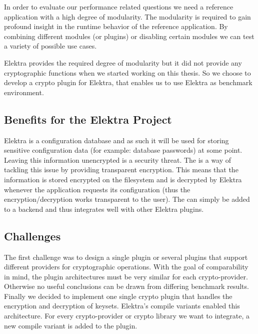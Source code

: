 In order to evaluate our performance related questions we need a reference application with a high degree of modularity.
The modularity is required to gain profound insight in the runtime behavior of the reference application.
By combining different modules (or plugins) or disabling certain modules we can test a variety of possible use cases.

Elektra provides the required degree of modularity but it did not provide any cryptographic functions when we started working on this thesis.
So we choose to develop a crypto plugin for Elektra, that enables us to use Elektra as benchmark environment.

\subsection{Benefits for the Elektra Project}

Elektra is a configuration database and as such it will be used for storing sensitive configuration data (for example: database passwords) at some point.
Leaving this information unencrypted is a security threat.
The \crypto{} is a way of tackling this issue by providing transparent encryption.
This means that the information is stored encrypted on the filesystem and is decrypted by Elektra whenever the application requests its configuration (thus the encryption/decryption works transparent to the user). The \crypto{} can simply be added to a backend and thus integrates well with other Elektra plugins.

\subsection{Challenges}

The first challenge was to design a single plugin or several plugins that support different providers for cryptographic operations.
With the goal of comparability in mind, the plugin architectures must be very similar for each crypto-provider.
Otherwise no useful conclusions can be drawn from differing benchmark results.
Finally we decided to implement one single crypto plugin that handles the encryption and decryption of keysets.
Elektra's compile variants enabled this architecture.
For every crypto-provider or crypto library we want to integrate, a new compile variant is added to the plugin.

